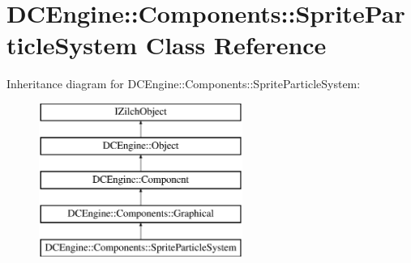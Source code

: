 \hypertarget{classDCEngine_1_1Components_1_1SpriteParticleSystem}{\section{D\-C\-Engine\-:\-:Components\-:\-:Sprite\-Particle\-System Class Reference}
\label{classDCEngine_1_1Components_1_1SpriteParticleSystem}
}
Inheritance diagram for D\-C\-Engine\-:\-:Components\-:\-:Sprite\-Particle\-System\-:\begin{figure}[H]
\begin{center}
\leavevmode
\includegraphics[height=5.000000cm]{classDCEngine_1_1Components_1_1SpriteParticleSystem}
\end{center}
\end{figure}

